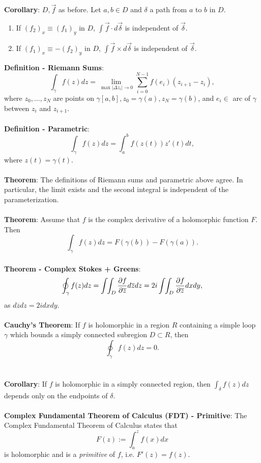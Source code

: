 \documentclass{article}
\begin{document}
\textbf{Corollary}: $D, \vec{f}$ as before. Let $a, b \in D$ and $\delta$ a path from $a$ to $b$ in $D$. \begin{enumerate}
    \item If $(f_2)_x \equiv (f_1)_y$ in $D$, $\int \vec{f} \cdot d \vec{\delta}$ is independent of $\vec{\delta}$. 
    \item If $(f_1)_x \equiv -(f_2)_y$ in $D$, $\int \vec{f} \times d \vec{\delta}$ is independent of $\vec{\delta}$. 
\end{enumerate} $ $ \\
\textbf{Definition - Riemann Sums}: $$\int_\gamma f(z) dz = \lim_{\max|\Delta  z_i| \rightarrow 0} \sum_{i = 0}^{N - 1} f(e_i)(z_{i + 1} - z_i),$$ where $z_0, \dots, z_N$ are points on $\gamma[a, b], z_0 = \gamma(a), z_N = \gamma(b)$, and $e_i \in$ arc of $\gamma$ between $z_{i}$ and $z_{i + 1}$. \\ \\
\textbf{Definition - Parametric}: $$\int_\gamma f(z)dz = \int_a^b f(z(t)) z'(t) dt,$$ where $z(t) = \gamma(t)$. \\ \\
\textbf{Theorem}: The definitions of Riemann sums and parametric above agree. In particular, the limit exists and the second integral is independent of the parameterization. \\ \\
\textbf{Theorem}: Assume that $f$ is the complex derivative of a holomorphic function $F$. Then $$\int_\gamma f(z)dz = F(\gamma(b)) - F(\gamma(a)).$$ \\
\textbf{Theorem - Complex Stokes + Greens}: $$\oint_\gamma f(z)dz = \int \negthickspace \int_D \frac{\partial f}{\partial \overline{z}} d\overline{z} dz = 2i \int \negthickspace\int_D \frac{\partial f}{\partial \overline{z}} dx dy,$$ as $d\overline{z} dz = 2i dx dy$. \\ \\
\textbf{Cauchy's Theorem}: If $f$ is holomorphic in a region $R$ containing a simple loop $\gamma$ which bounds a simply connected subregion $D \subset R$, then $$\oint_\gamma f(z)dz = 0.$$ \\ \\
\textbf{Corollary}: If $f$ is holomorphic in a simply connected region, then $\int_\delta f(z)dz$ depends only on the endpoints of $\delta$. \\ \\
\textbf{Complex Fundamental Theorem of Calculus (FDT) - Primitive}: The Complex Fundamental Theorem of Calculus states that $$F(z) := \int_a^z f(x) dx$$ is holomorphic and is a \textit{primitive} of $f$, i.e. $F'(z) = f(z)$. \\ \\
\end{document}
